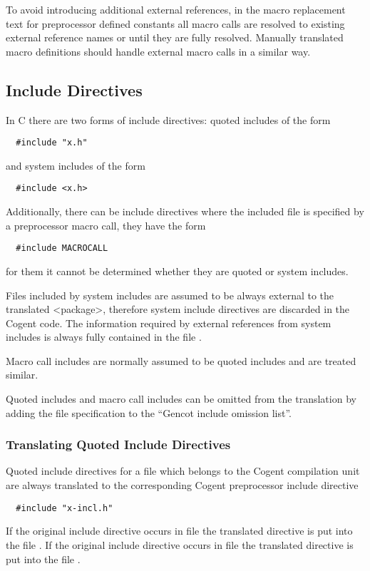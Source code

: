 To avoid introducing additional external references, in the macro replacement text for preprocessor defined 
constants all macro calls are resolved to existing external reference names or until they are fully resolved.
Manually translated macro definitions should handle external macro calls in a similar way.

\subsection{Include Directives}
\label{design-preprocessor-incl}

In C there are two forms of include directives: quoted includes of the form
\begin{verbatim}
  #include "x.h"
\end{verbatim}
and system includes of the form
\begin{verbatim}
  #include <x.h>
\end{verbatim}
Additionally, there can be include directives where the included file is specified by a preprocessor macro call,
they have the form
\begin{verbatim}
  #include MACROCALL
\end{verbatim}
for them it cannot be determined whether they are quoted or system includes.

Files included by system includes are assumed to be always external to the translated <package>, therefore system
include directives are discarded in the Cogent code. The information required by external references from system 
includes is always fully contained in the file .

Macro call includes are normally assumed to be quoted includes and are treated similar.

Quoted includes and macro call includes can be omitted from the translation by adding the file specification
to the ``Gencot include omission list''. 

\subsubsection{Translating Quoted Include Directives}

Quoted include directives for a file  which belongs to the Cogent compilation unit are always translated 
to the corresponding Cogent preprocessor include directive
\begin{verbatim}
  #include "x-incl.h"
\end{verbatim}
If the original include directive occurs in file  the translated directive is put into the file 
. If the original include directive occurs in file  the translated directive is put into the file
. 

